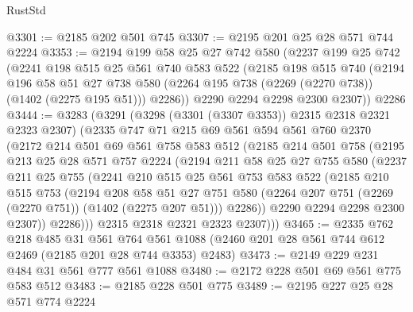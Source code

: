 \begin{lexlean}{RustStd}
\begin{coremodule}
@3301 := @2185 @202 @501 @745
@3307 := @2195 @201 @25 @28 @571 @744 @2224
@3353 := @2194
    @199
    @58
    @25
    @27
    @742
    @580
    (@2237
      @199
      @25
      @742
      (@2241
        @198
        @515
        @25
        @561
        @740
        @583
        @522
        (@2185
          @198
          @515
          @740
          (@2194
            @196
            @58
            @51
            @27
            @738
            @580
            (@2264 @195 @738 (@2269 (@2270 @738)) (@1402 (@2275 @195 @51)))
            @2286))
        @2290
        @2294
        @2298
        @2300
        @2307))
    @2286
@3444 := @3283
    (@3291
      (@3298 (@3301 (@3307 @3353)) @2315 @2318 @2321 @2323 @2307)
      (@2335
        @747
        @71
        @215
        @69
        @561
        @594
        @561
        @760
        @2370
        (@2172
          @214
          @501
          @69
          @561
          @758
          @583
          @512
          (@2185
            @214
            @501
            @758
            (@2195
              @213
              @25
              @28
              @571
              @757
              @2224
              (@2194
                @211
                @58
                @25
                @27
                @755
                @580
                (@2237
                  @211
                  @25
                  @755
                  (@2241
                    @210
                    @515
                    @25
                    @561
                    @753
                    @583
                    @522
                    (@2185
                      @210
                      @515
                      @753
                      (@2194
                        @208
                        @58
                        @51
                        @27
                        @751
                        @580
                        (@2264 @207 @751 (@2269 (@2270 @751)) (@1402 (@2275 @207 @51)))
                        @2286))
                    @2290
                    @2294
                    @2298
                    @2300
                    @2307))
                @2286)))
          @2315
          @2318
          @2321
          @2323
          @2307)))
@3465 := @2335
    @762
    @218
    @485
    @31
    @561
    @764
    @561
    @1088
    (@2460 @201 @28 @561 @744 @612 @2469 (@2185 @201 @28 @744 @3353) @2483)
@3473 := @2149 @229 @231 @484 @31 @561 @777 @561 @1088
@3480 := @2172 @228 @501 @69 @561 @775 @583 @512
@3483 := @2185 @228 @501 @775
@3489 := @2195 @227 @25 @28 @571 @774 @2224

\end{coremodule}
\end{lexlean}
